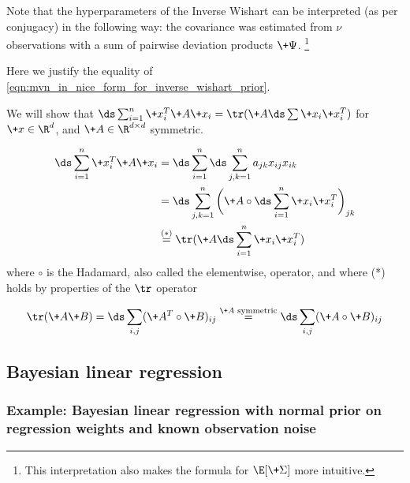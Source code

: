 \documentclass{article} %
\begin{document}
\begin{remark}{}
\label{rk:inverse_wishart_hyperparameter_interpretation}
Note that the hyperparameters of the Inverse Wishart can be interpreted (as per conjugacy) in the following way: the covariance was estimated from $\nu$ observations with a sum of pairwise deviation products $\+\Psi$. \footnote{This interpretation also makes the formula for $\E[\+\Sigma]$ more intuitive.}
\end{remark}



\begin{remark}{} 
\label{rk:reexpressing_mvn_in_nice_form_for_inverse_wishart_prior}

Here we justify the equality of \eqref{eqn:mvn_in_nice_form_for_inverse_wishart_prior}.

We will show that $\ds\sum_{i=1}^n \+x_i^T \+A \+x_i = \tr(\+A \ds\sum \+x_i \+x_i^T)$ for $\+x \in \R^d$,  and $\+A \in \R^{d \times d}$ symmetric.

\begin{align*}
\ds\sum_{i=1}^n \+x_i^T \+A \+x_i  &= \ds\sum_{i=1}^n \ds\sum_{j,k=1}^n a_{jk} x_{ij} x_{ik} \\
& = \ds\sum_{j,k=1}^n \bigg( \+A \circ \ds\sum_{i=1}^n \+x_i \+x_i^T \bigg)_{jk} \\
& \stackrel{(*)}{=} \tr (\+A \ds\sum_{i=1}^n \+x_i \+x_i^T) 
\end{align*}
where $\circ$ is the Hadamard,  also called the elementwise,  operator,  and where (*) holds by properties of the $\tr$ operator

\[ \tr(\+A\+B) = \ds\sum_{i,j} (\+A^T \circ \+B)_{ij}  \stackrel{\text{$\+A$ symmetric}}{=}  \ds\sum_{i,j} (\+A \circ \+B)_{ij}\]

\end{remark}

\subsection{Bayesian linear regression}

\subsubsection{Example:  Bayesian linear regression with normal prior on regression weights and known observation noise} \label{sec:Bayesian_linear_regression_with_normal_prior}
\end{document}
